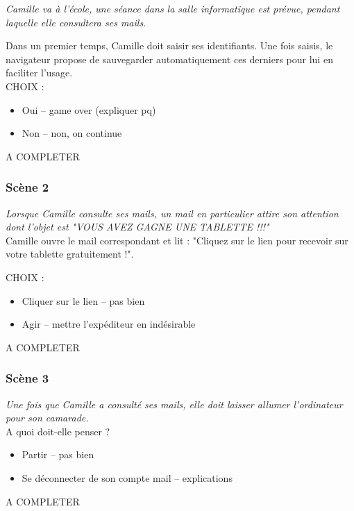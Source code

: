\documentclass[a4paper]{article}
\begin{document}
        \textit{Camille va à l'école, une séance dans la salle informatique est prévue, pendant laquelle elle consultera ses mails.}
        
        Dans un premier temps, Camille doit saisir ses identifiants. Une fois saisis, le navigateur propose de sauvegarder automatiquement ces derniers pour lui en faciliter l'usage. \\
        
        CHOIX :
        \begin{itemize}
            \item Oui -- game over (expliquer pq)
            \item Non -- non, on continue
        \end{itemize}
        A COMPLETER
    
    \subsubsection{Scène 2}
    
        \textit{Lorsque Camille consulte ses mails, un mail en particulier attire son attention dont l'objet est "VOUS AVEZ GAGNE UNE TABLETTE !!!"} \\
        
        Camille ouvre le mail correspondant et lit : "Cliquez sur le lien pour recevoir sur votre tablette gratuitement !".
        
        CHOIX :
            \begin{itemize}
                \item Cliquer sur le lien -- pas bien
                \item Agir -- mettre l'expéditeur en indésirable
            \end{itemize}
            A COMPLETER
        
    \subsubsection{Scène 3}
    
        \textit{Une fois que Camille a consulté ses mails, elle doit laisser allumer l'ordinateur pour son camarade. } \\
        
        A quoi doit-elle penser ?
        \begin{itemize}
            \item Partir -- pas bien
            \item Se déconnecter de son compte mail -- explications
        \end{itemize}
            A COMPLETER
            
\end{document}
